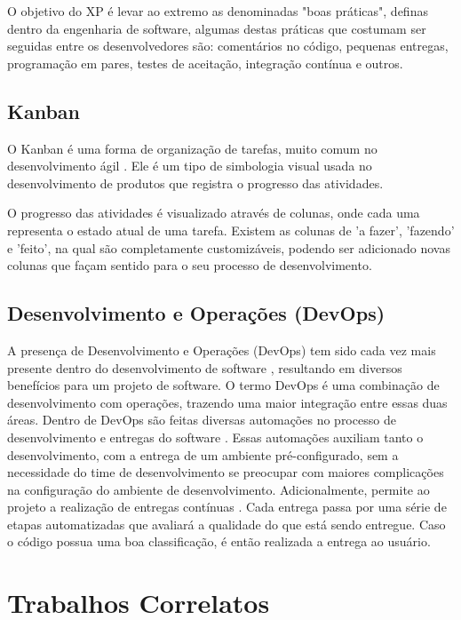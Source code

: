 {O objetivo do XP é levar ao extremo as denominadas "boas práticas", definas dentro da engenharia de software, algumas destas práticas que costumam ser seguidas entre os desenvolvedores são: comentários no código, pequenas entregas, programação em pares, testes de aceitação, integração contínua e outros.


\subsection{Kanban}

O Kanban é uma forma de organização de tarefas, muito comum no desenvolvimento ágil \cite{kniberg2010kanban}. Ele é um tipo de simbologia visual usada no desenvolvimento de produtos que registra o progresso das atividades.

O progresso das atividades é visualizado através de colunas, onde cada uma representa o estado atual de uma tarefa. Existem as colunas de 'a fazer', 'fazendo' e 'feito', na qual são completamente customizáveis, podendo ser adicionado novas colunas que façam sentido para o seu processo de desenvolvimento.

\subsection{Desenvolvimento e Operações (DevOps)}

A presença de Desenvolvimento e Operações (DevOps) tem sido cada vez mais presente dentro do desenvolvimento de software \cite{devops_adoption}, resultando em diversos benefícios para um projeto de software. O termo DevOps é uma combinação de desenvolvimento com operações, trazendo uma maior integração entre essas duas áreas. Dentro de DevOps são feitas diversas automações no processo de desenvolvimento e entregas do software \cite{ebert2016}. Essas automações auxiliam tanto o desenvolvimento, com a entrega de um ambiente pré-configurado, sem a necessidade do time de desenvolvimento se preocupar com maiores complicações na configuração do ambiente de desenvolvimento. Adicionalmente, permite ao projeto a realização de entregas contínuas \cite{humble2010continuous}. Cada entrega passa por uma série de etapas automatizadas que avaliará a qualidade do que está sendo entregue. Caso o código possua uma boa classificação, é então realizada a entrega ao usuário.

}

\section{Trabalhos Correlatos}
\label{sec:trab_cor}

